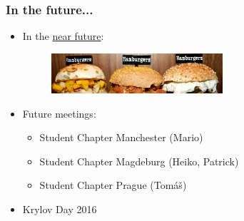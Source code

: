 \documentclass{beamer}
\begin{document}
\begin{frame}
 \frametitle{In the future...}
 \begin{itemize}
  \item In the \href{http://www.burgerz.nl/nl/menu/burgers}{near future}:
    \begin{figure}[t]
  \includegraphics[width=0.6\textwidth]{pics/11.png}
  \end{figure}
  \pause
  \vspace{0.3cm}
  \item Future meetings:
  \begin{itemize}
  \item Student Chapter Manchester (Mario)
  \item Student Chapter Magdeburg (Heiko, Patrick)
  \item Student Chapter Prague (Tom{\'a}{\v s})
  \end{itemize}
  \pause
  \item {\color{red}Krylov Day 2016}
 \end{itemize}

\end{frame}
\end{document}
